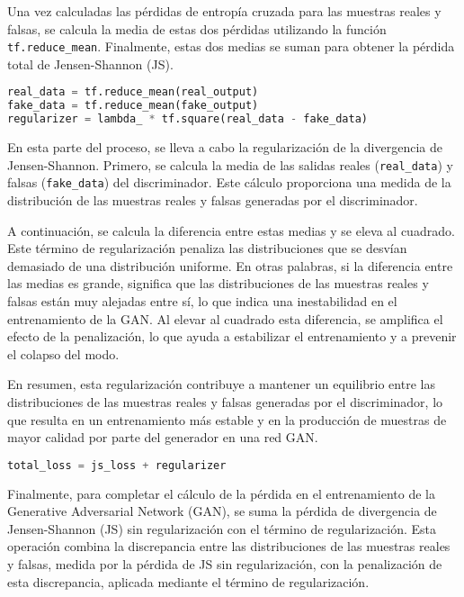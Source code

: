Una vez calculadas las pérdidas de entropía cruzada para las muestras reales y falsas, se calcula la media de estas dos pérdidas utilizando la función \texttt{tf.reduce\_mean}. Finalmente, estas dos medias se suman para obtener la pérdida total de Jensen-Shannon (JS).

\label{sec:Regularización de la divergencia de Jensen-Shannon}
\begin{lstlisting}[language=Python]
real_data = tf.reduce_mean(real_output)
fake_data = tf.reduce_mean(fake_output)
regularizer = lambda_ * tf.square(real_data - fake_data)
\end{lstlisting}
En esta parte del proceso, se lleva a cabo la regularización de la divergencia de Jensen-Shannon. Primero, se calcula la media de las salidas reales (\texttt{real\_data}) y falsas (\texttt{fake\_data}) del discriminador. Este cálculo proporciona una medida de la distribución de las muestras reales y falsas generadas por el discriminador.

A continuación, se calcula la diferencia entre estas medias y se eleva al cuadrado. Este término de regularización penaliza las distribuciones que se desvían demasiado de una distribución uniforme. En otras palabras, si la diferencia entre las medias es grande, significa que las distribuciones de las muestras reales y falsas están muy alejadas entre sí, lo que indica una inestabilidad en el entrenamiento de la GAN. Al elevar al cuadrado esta diferencia, se amplifica el efecto de la penalización, lo que ayuda a estabilizar el entrenamiento y a prevenir el colapso del modo.

En resumen, esta regularización contribuye a mantener un equilibrio entre las distribuciones de las muestras reales y falsas generadas por el discriminador, lo que resulta en un entrenamiento más estable y en la producción de muestras de mayor calidad por parte del generador en una red GAN.

\label{sec:Cálculo de la pérdida total}
\begin{lstlisting}[language=Python]
total_loss = js_loss + regularizer
\end{lstlisting}
Finalmente, para completar el cálculo de la pérdida en el entrenamiento de la Generative Adversarial Network (GAN), se suma la pérdida de divergencia de Jensen-Shannon (JS) sin regularización con el término de regularización. Esta operación combina la discrepancia entre las distribuciones de las muestras reales y falsas, medida por la pérdida de JS sin regularización, con la penalización de esta discrepancia, aplicada mediante el término de regularización.

